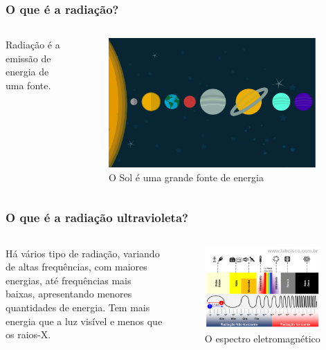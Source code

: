 \documentclass{beamer}
\begin{document}
	\begin{frame}
	\frametitle{O que é a radiação?}	
		\begin{columns}
			Radiação é a emissão de energia de uma fonte.
			\begin{figure}[htb]
				\includegraphics[width=0.95\textwidth]{img/sistema-solar.png}
				\caption{O Sol é uma grande fonte de energia}
			\end{figure}
	
		\end{columns}	
		
	\end{frame}
	
	\begin{frame}
		\frametitle{O que é a radiação ultravioleta?}	
		\begin{columns}
			\column{.5\textwidth}
				Há vários tipo de radiação, variando de altas frequências, com maiores energias, até frequências mais baixas, apresentando 
				menores quantidades de energia. Tem mais energia que a luz visível e menos que os raios-X.
			
			\column{.5\textwidth}
			\begin{figure}[htb]
				\includegraphics[width=0.95\textwidth]{img/espectro_eletromagnetico.png}
				\caption{O espectro eletromagnético}
			\end{figure}
					
		\end{columns}
	\end{frame}
	
\end{document}
